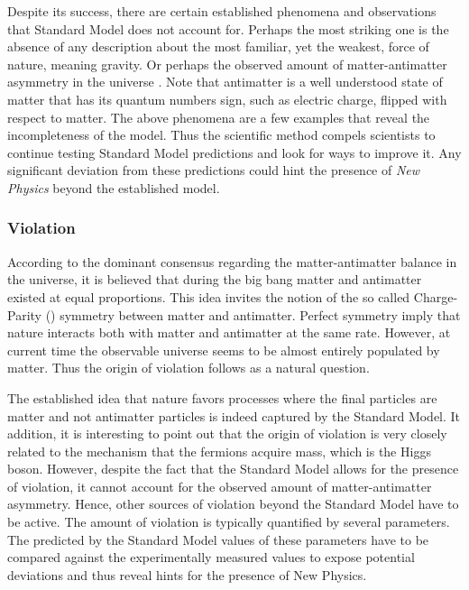 Despite its success, there are certain established phenomena and observations that Standard
Model does not account for. Perhaps the most striking one is the absence of any description about the most familiar,
yet the weakest, force of nature, meaning gravity. Or perhaps the observed amount of matter-antimatter
asymmetry in the universe \cite{more-cpv-huet,more-cpv-gavela_I,more-cpv-gavela_II}.
Note that antimatter is a well understood state of matter that has its quantum numbers sign,
such as electric charge, flipped with respect to matter. The above phenomena are a few
examples that reveal the incompleteness of the model. Thus the scientific method compels
scientists to continue testing Standard Model predictions and look for ways to improve it.
Any significant deviation from these predictions could hint the presence of
{\it New Physics} beyond the established model.

\subsubsection{\CP Violation}
According to the dominant consensus regarding the matter-antimatter balance in the
universe, it is believed that during the big bang matter and antimatter existed at
equal proportions. This idea invites the notion of the so called Charge-Parity (\CP)
symmetry between matter and antimatter. Perfect \CP symmetry imply that nature
interacts both with matter and antimatter at the same rate.
However, at current time the observable universe seems to be almost entirely populated by
matter. Thus the origin of \CP violation follows as a natural question.

The established idea that nature favors processes where the final particles are matter
and not antimatter particles is indeed captured by the Standard Model. It addition, it
is interesting to point out that the origin of \CP violation is very closely related
to the mechanism that the fermions acquire mass, which is the Higgs boson. However,
despite the fact that the Standard Model allows for the presence of \CP violation,
it cannot account for the observed amount of matter-antimatter asymmetry.
Hence, other sources of \CP violation beyond the Standard Model have to be active.
The amount of \CP violation is typically quantified by several parameters.
The predicted by the Standard Model values of these parameters have to be compared
against the experimentally measured values to expose potential deviations and thus
reveal hints for the presence of New Physics.

